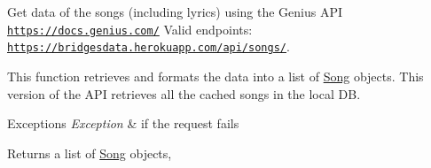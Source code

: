 Get data of the songs (including lyrics) using the Genius A\+P\+I \href{https://docs.genius.com/}{\tt https\+://docs.\+genius.\+com/} Valid endpoints\+: \href{https://bridgesdata.herokuapp.com/api/songs/}{\tt https\+://bridgesdata.\+herokuapp.\+com/api/songs/}. 

This function retrieves and formats the data into a list of \hyperlink{namespace_bridges_1_1data__src__dependent_1_1_song}{Song} objects. This version of the A\+P\+I retrieves all the cached songs in the local D\+B.


\begin{DoxyExceptions}{Exceptions}
{\em Exception} & if the request fails\\
\hline
\end{DoxyExceptions}
\begin{DoxyReturn}{Returns}
a list of \hyperlink{namespace_bridges_1_1data__src__dependent_1_1_song}{Song} objects, 
\end{DoxyReturn}

